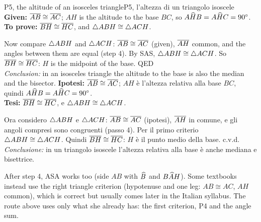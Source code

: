 \begin{proofbox}{P5, the altitude of an isosceles triangle}{P5, l'altezza di un triangolo isoscele}
\textbf{Given:} $\overline{AB} \cong \overline{AC}$; $AH$ is the altitude to the base $BC$, so $A\widehat{H}B = A\widehat{H}C = 90^\circ$.\\
\textbf{To prove:} $\overline{BH} \cong \overline{HC}$, and $\triangle ABH \cong \triangle ACH$.
\begin{steps}
\end{steps}
Now compare $\triangle ABH$ and $\triangle ACH$: $\overline{AB} \cong \overline{AC}$ (given), $\overline{AH}$ common, and the angles between them are equal (step 4). By SAS, $\triangle ABH \cong \triangle ACH$. So $\overline{BH} \cong \overline{HC}$: $H$ is the midpoint of the base. \hfill QED\\
\emph{Conclusion:} in an isosceles triangle the altitude to the base is also the median and the bisector.
\tcblower
\textbf{Ipotesi:} $\overline{AB} \cong \overline{AC}$; $AH$ è l'altezza relativa alla base $BC$, quindi $A\widehat{H}B = A\widehat{H}C = 90^\circ$.\\
\textbf{Tesi:} $\overline{BH} \cong \overline{HC}$, e $\triangle ABH \cong \triangle ACH$.
\begin{steps}
\end{steps}
Ora considero $\triangle ABH$ e $\triangle ACH$: $\overline{AB} \cong \overline{AC}$ (ipotesi), $\overline{AH}$ in comune, e gli angoli compresi sono congruenti (passo 4). Per il primo criterio $\triangle ABH \cong \triangle ACH$. Quindi $\overline{BH} \cong \overline{HC}$: $H$ è il punto medio della base. \hfill c.v.d.\\
\emph{Conclusione:} in un triangolo isoscele l'altezza relativa alla base è anche mediana e bisettrice.
\end{proofbox}

\begin{tutor}
After step 4, ASA works too (side $AB$ with $\widehat{B}$ and $B\widehat{A}H$). Some textbooks instead use the right triangle criterion (hypotenuse and one leg: $AB \cong AC$, $AH$ common), which is correct but usually comes later in the Italian syllabus. The route above uses only what she already has: the first criterion, P4 and the angle sum.
\end{tutor}

